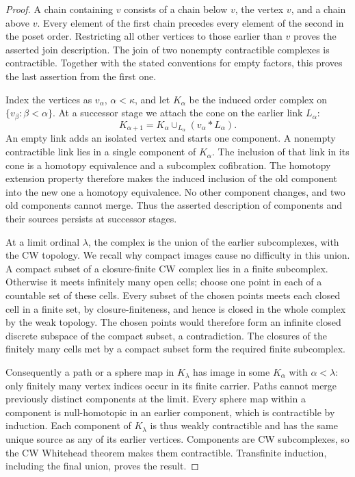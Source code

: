 \begin{proof}
A chain containing $v$ consists of a chain below $v$, the vertex $v$,
and a chain above $v$.  Every element of the first chain precedes every
element of the second in the poset order.  Restricting all other vertices
to those earlier than $v$ proves the asserted join description.  The
join of two nonempty contractible complexes is contractible.  Together
with the stated conventions for empty factors, this proves the last
assertion from the first one.

Index the vertices as $v_\alpha$, $\alpha<\kappa$, and let $K_\alpha$
be the induced order complex on $\{v_\beta:\beta<\alpha\}$.  At a
successor stage we attach the cone on the earlier link $L_\alpha$:
\[
 K_{\alpha+1}=K_\alpha\cup_{L_\alpha}(v_\alpha*L_\alpha).
\]
An empty link adds an isolated vertex and starts one component.  A
nonempty contractible link lies in a single component of $K_\alpha$.
The inclusion of that link in its cone is a homotopy equivalence and
a subcomplex cofibration.  The homotopy extension property therefore
makes the induced inclusion of the old component into the new one a
homotopy equivalence.  No other component changes, and two old
components cannot merge.  Thus the asserted description of components
and their sources persists at successor stages.

At a limit ordinal $\lambda$, the complex is the union of the earlier
subcomplexes, with the CW topology.  We recall why compact images cause
no difficulty in this union.  A compact subset of a closure-finite CW
complex lies in a finite subcomplex.  Otherwise it meets infinitely many
open cells; choose one point in each of a countable set of these cells.
Every subset of the chosen points meets each closed cell in a finite
set, by closure-finiteness, and hence is closed in the whole complex by
the weak topology.  The chosen points would therefore form an infinite
closed discrete subspace of the compact subset, a contradiction.  The
closures of the finitely many cells met by a compact subset form the
required finite subcomplex.

Consequently a path or a sphere map in $K_\lambda$ has image in some
$K_\alpha$ with $\alpha<\lambda$: only finitely many vertex indices
occur in its finite carrier.  Paths cannot merge previously distinct
components at the limit.  Every sphere map within a component is
null-homotopic in an earlier component, which is contractible by
induction.  Each component of $K_\lambda$ is thus weakly contractible
and has the same unique source as any of its earlier vertices.
Components are CW subcomplexes, so the CW Whitehead theorem makes them
contractible.  Transfinite induction, including the final union,
proves the result.
\end{proof}

